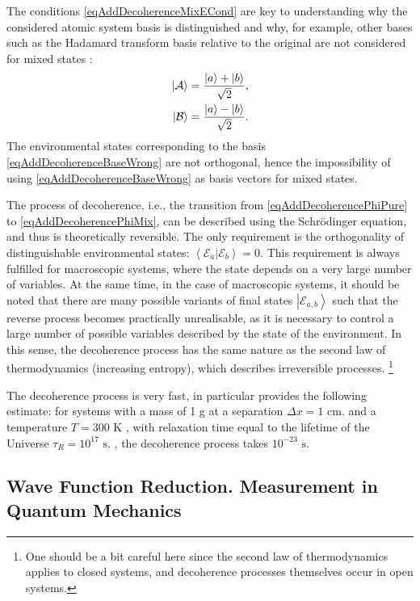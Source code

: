 The conditions \eqref{eqAddDecoherenceMixECond} are key to understanding why the considered atomic system basis is distinguished and why, for example, other bases such as the Hadamard transform basis relative to the original are not considered for mixed states :
\begin{eqnarray}
\left|\mathcal{A}\right> = \frac{\ket{a} + \ket{b}}
              {\sqrt{2}},
\nonumber \\
\left|\mathcal{B}\right> = \frac{\ket{a} - \ket{b}}
              {\sqrt{2}}.
\label{eqAddDecoherenceBaseWrong}
\end{eqnarray}
The environmental states corresponding to the basis \eqref{eqAddDecoherenceBaseWrong} are not orthogonal, hence the impossibility of using \eqref{eqAddDecoherenceBaseWrong} as basis vectors for mixed states.

The process of decoherence, i.e., the transition from \eqref{eqAddDecoherencePhiPure} to \eqref{eqAddDecoherencePhiMix}, can be described using the Schrödinger equation, and thus is theoretically reversible. The only requirement is the orthogonality of distinguishable environmental states: $\left<\mathcal{E}_a\right.\left|\mathcal{E}_b\right> = 0$. This requirement is always fulfilled for macroscopic systems, where the state depends on a very large number of variables. At the same time, in the case of macroscopic systems, it should be noted that there are many possible variants of final states $\left|\mathcal{E}_{a,b}\right>$ such that the reverse process becomes practically unrealisable, as it is necessary to control a large number of possible variables described by the state of the environment. In this sense, the decoherence process has the same nature as the second law of thermodynamics (increasing entropy), which describes irreversible processes.
\footnote{One should be a bit careful here since the second law of thermodynamics applies to closed systems, and decoherence processes themselves occur in open systems.}

The decoherence process is very fast, in particular \cite{bZurek02} provides the following estimate: for systems with a mass of 1 g at a separation $\Delta x = 1 \mbox{ cm.}$ and a temperature $T=300 \mbox{ K }$, with relaxation time equal to the lifetime of the Universe $\tau_R = 10^{17} \mbox{ s. }$, the decoherence process takes $10^{-23} \mbox{ s. }$ 

\subsection{Wave Function Reduction. Measurement in Quantum Mechanics}
\label{sec:add:reduction}


